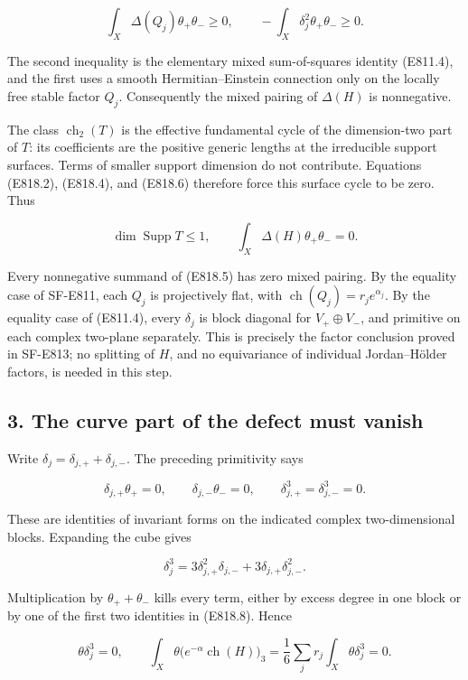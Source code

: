 \[
 \int_X\Delta(Q_j)\theta_+\theta_-\ge0,
 \qquad -\int_X\delta_j^2\theta_+\theta_-\ge0.
 \tag{E818.6}
\]

The second inequality is the elementary mixed sum-of-squares identity
(E811.4), and the first uses a smooth Hermitian--Einstein connection
only on the locally free stable factor \(Q_j\). Consequently the mixed
pairing of \(\Delta(H)\) is nonnegative.

The class \(\operatorname{ch}_2(T)\) is the effective fundamental cycle
of the dimension-two part of \(T\): its coefficients are the positive
generic lengths at the irreducible support surfaces. Terms of smaller
support dimension do not contribute. Equations (E818.2), (E818.4), and
(E818.6) therefore force this surface cycle to be zero. Thus

\[
 \dim\operatorname{Supp}T\le1,
 \qquad
 \int_X\Delta(H)\theta_+\theta_-=0.
 \tag{E818.7}
\]

Every nonnegative summand of (E818.5) has zero mixed pairing. By the
equality case of SF-E811, each \(Q_j\) is projectively flat, with
\(\operatorname{ch}(Q_j)=r_je^{\alpha_j}\). By the equality case of
(E811.4), every \(\delta_j\) is block diagonal for \(V_+\oplus V_-\),
and primitive on each complex two-plane separately. This is precisely
the factor conclusion proved in SF-E813; no splitting of \(H\), and no
equivariance of individual Jordan--Hölder factors, is needed in this
step.

\subsection{3. The curve part of the defect must
vanish}\label{SF-E818-the-curve-part-of-the-defect-must-vanish}

Write \(\delta_j=\delta_{j,+}+\delta_{j,-}\). The preceding primitivity
says

\[
 \delta_{j,+}\theta_+=0,\qquad
 \delta_{j,-}\theta_-=0,
 \qquad \delta_{j,+}^3=\delta_{j,-}^3=0.
 \tag{E818.8}
\]

These are identities of invariant forms on the indicated complex
two-dimensional blocks. Expanding the cube gives

\[
 \delta_j^3=3\delta_{j,+}^2\delta_{j,-}
                +3\delta_{j,+}\delta_{j,-}^2.
\]

Multiplication by \(\theta_++\theta_-\) kills every term, either by
excess degree in one block or by one of the first two identities in
(E818.8). Hence

\[
 \theta\delta_j^3=0,
 \qquad
 \int_X\theta\bigl(e^{-\alpha}\operatorname{ch}(H)\bigr)_3
   =\frac16\sum_jr_j\int_X\theta\delta_j^3=0.
 \tag{E818.9}
\]

